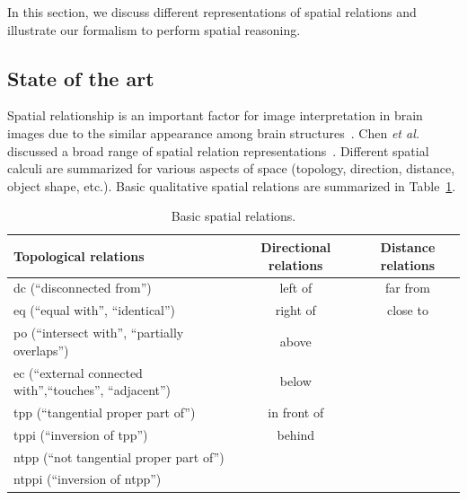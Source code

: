\documentclass{article}
\begin{document}
 In this section, we discuss different representations of spatial relations and illustrate our formalism to perform spatial reasoning.

\subsection{State of the art}
Spatial relationship is an important factor for image interpretation in brain images due to the similar appearance among brain structures~\cite{Bloch2005fuzzy}.
Chen \textit{et al.} discussed a broad range of spatial relation representations~\cite{chen2013survey}. Different spatial calculi are summarized for various aspects of space 
(topology, direction, distance, object shape, etc.). Basic qualitative spatial relations are summarized in Table~\ref{tab:sr}.
\begin{center}
\begin{table}[h]
   \begin{tabular}{| l | c | c |}
    \hline
    Topological relations~\cite{randell1992spatial} & Directional relations & Distance relations \\ \hline
    dc (``disconnected from'') & left of & far from \\ 
    eq (``equal with'', ``identical'') & right of & close to \\
    po (``intersect with'', ``partially overlaps'') & above  &   \\
    ec (``external connected with'',``touches'', ``adjacent'') & below &  \\
    tpp (``tangential proper part of'') & in front of &  \\
    tppi (``inversion of tpp'') &  behind  &   \\
    ntpp (``not tangential proper part of'') &   &  \\
    ntppi (``inversion of ntpp'') &  &  \\
    \hline
  \end{tabular}
  \caption{Basic spatial relations.}
  \label{tab:sr}  
\end{table}
\end{center}
\end{document}
